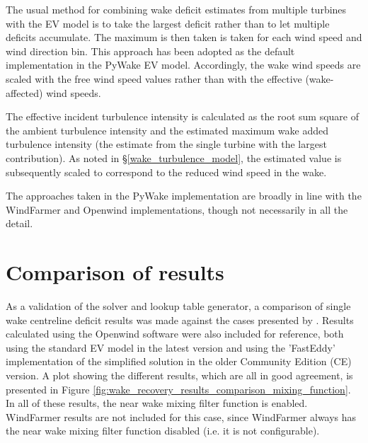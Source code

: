 \documentclass[11pt,a4paper]{article}
\begin{document}
The usual method for combining wake deficit estimates from multiple turbines with the EV model is to take the largest deficit rather than to let multiple deficits accumulate. The maximum is then taken is taken for each wind speed and wind direction bin. This approach has been adopted as the default implementation in the PyWake EV model. Accordingly, the wake wind speeds are scaled with the free wind speed values rather than with the effective (wake-affected) wind speeds.

The effective incident turbulence intensity is calculated as the root sum square of the ambient turbulence intensity and the estimated maximum wake added turbulence intensity (the estimate from the single turbine with the largest contribution). As noted in §\ref{wake_turbulence_model}, the estimated value is subsequently scaled to correspond to the reduced wind speed in the wake.

The approaches taken in the PyWake implementation are broadly in line with the WindFarmer and Openwind implementations, though not necessarily in all the detail.

\section{Comparison of results}\label{results_comparison}

As a validation of the solver and lookup table generator, a comparison of single wake centreline deficit results was made against the cases presented by \textcite{Anderson_2011}. Results calculated using the Openwind software were also included for reference, both using the standard EV model in the latest version and using the 'FastEddy' implementation of the simplified solution in the older Community Edition (CE) version. A plot showing the different results, which are all in good agreement, is presented in Figure \ref{fig:wake_recovery_results_comparison_mixing_function}. In all of these results, the near wake mixing filter function is enabled. WindFarmer results are not included for this case, since WindFarmer always has the near wake mixing filter function disabled (i.e. it is not configurable).
\end{document}
